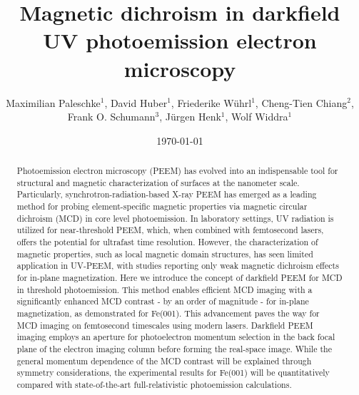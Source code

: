 \documentclass[prl,twocolumn,floatfix]{revtex4-2}
\begin{document}
\title{Magnetic dichroism in darkfield UV photoemission electron microscopy}
\author{Maximilian Paleschke$^{1}$, David Huber$^{1}$, Friederike Wührl$^1$, Cheng-Tien Chiang$^2$, Frank O. Schumann$^3$, Jürgen Henk$^1$, Wolf Widdra$^1$}





\date{\today}

\begin{abstract}
    Photoemission electron microscopy (PEEM) has evolved into an indispensable tool for structural and magnetic characterization of surfaces at the nanometer scale. Particularly, synchrotron-radiation-based X-ray PEEM has emerged as a leading method for probing element-specific magnetic properties via magnetic circular dichroism (MCD) in core level photoemission. In laboratory settings, UV radiation is utilized for near-threshold PEEM, which, when combined with femtosecond lasers, offers the potential for ultrafast time resolution. However, the characterization of magnetic properties, such as local magnetic domain structures, has seen limited application in UV-PEEM, with studies reporting only weak magnetic dichroism effects for in-plane magnetization. 
    Here we introduce the concept of darkfield PEEM for MCD in threshold photoemission. This method enables efficient MCD imaging with a significantly enhanced MCD contrast - by an order of magnitude - for in-plane magnetization, as demonstrated for Fe(001). This advancement paves the way for MCD imaging on femtosecond timescales using modern lasers. Darkfield PEEM imaging employs an aperture for photoelectron momentum selection in the back focal plane of the electron imaging column before forming the real-space image. While the general momentum dependence of the MCD contrast will be explained through symmetry considerations, the experimental results for Fe(001) will be quantitatively compared with state-of-the-art full-relativistic photoemission calculations.
\end{abstract}

\pacs{}

\maketitle
\end{document}
